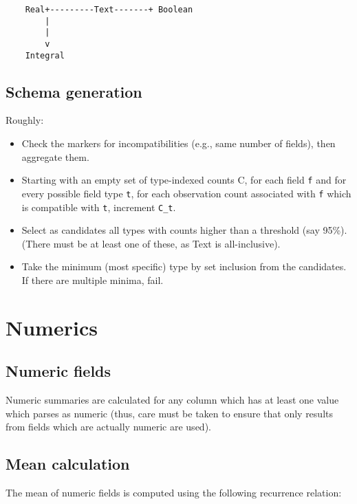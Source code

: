 \documentclass[a4paper]{article}
\begin{document}
\begin{verbatim}
    Real+---------Text-------+ Boolean
        |
        |
        v
    Integral
\end{verbatim}

\subsection{Schema generation}\label{schema-generation}

Roughly:

\begin{itemize}
\item
  Check the markers for incompatibilities (e.g., same number of fields),
  then aggregate them.
\item
  Starting with an empty set of type-indexed counts C, for each field
  \texttt{f} and for every possible field type \texttt{t}, for each
  observation count associated with \texttt{f} which is compatible with
  \texttt{t}, increment \texttt{C\_t}.
\item
  Select as candidates all types with counts higher than a threshold
  (say 95\%). (There must be at least one of these, as Text is
  all-inclusive).
\item
  Take the minimum (most specific) type by set inclusion from the
  candidates. If there are multiple minima, fail.
\end{itemize}

\section{Numerics}\label{numerics}

\subsection{Numeric fields}\label{numeric-fields}

Numeric summaries are calculated for any column which has at least one
value which parses as numeric (thus, care must be taken to ensure that
only results from fields which are actually numeric are used).

\subsection{Mean calculation}\label{mean-calculation}

The mean of numeric fields is computed using the following recurrence
relation\cite[pp.~232]{Knuth1997}:
\end{document}
